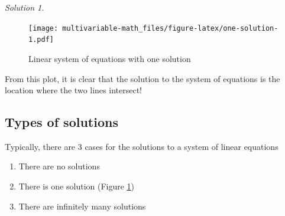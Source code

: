 \documentclass[
]{book}
\newenvironment{Shaded}{\begin{snugshade}}{\end{snugshade}}
\newcommand{\CommentTok}[1]{\textcolor[rgb]{0.56,0.35,0.01}{\textit{#1}}}
\newcommand{\DataTypeTok}[1]{\textcolor[rgb]{0.13,0.29,0.53}{#1}}
\newcommand{\DecValTok}[1]{\textcolor[rgb]{0.00,0.00,0.81}{#1}}
\newcommand{\FloatTok}[1]{\textcolor[rgb]{0.00,0.00,0.81}{#1}}
\newcommand{\KeywordTok}[1]{\textcolor[rgb]{0.13,0.29,0.53}{\textbf{#1}}}
\newcommand{\NormalTok}[1]{#1}
\newcommand{\OperatorTok}[1]{\textcolor[rgb]{0.81,0.36,0.00}{\textbf{#1}}}
\newcommand{\StringTok}[1]{\textcolor[rgb]{0.31,0.60,0.02}{#1}}
\providecommand{\tightlist}{%
  \setlength{\itemsep}{0pt}\setlength{\parskip}{0pt}}
\theoremstyle{definition}
\theoremstyle{definition}
\theoremstyle{definition}
\theoremstyle{remark}
\newtheorem*{solution}{Solution}
\begin{document}
\begin{solution}
\begin{Shaded}
\end{Shaded}

\begin{figure}
\centering
\texttt{[image: multivariable-math\_files/figure-latex/one-solution-1.pdf]}
\caption{\label{fig:one-solution}Linear system of equations with one solution}
\end{figure}

From this plot, it is clear that the solution to the system of equations is the location where the two lines intersect!

\end{solution}

\hypertarget{types-of-solutions}{%
\subsection{Types of solutions}\label{types-of-solutions}}

Typically, there are 3 cases for the solutions to a system of linear equations

\begin{enumerate}
\def\labelenumi{\arabic{enumi})}
\tightlist
\item
  There are no solutions
\item
  There is one solution (Figure \ref{fig:one-solution})
\item
  There are infinitely many solutions
\end{enumerate}
\end{document}
